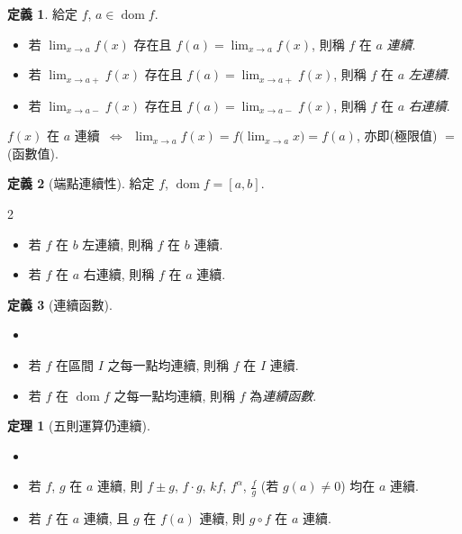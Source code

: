 \documentclass[12pt]{extarticle}
\newcommand{\ds}{\displaystyle}
\newcommand{\ifff}{\,\Longleftrightarrow\,}
\DeclareMathOperator*{\dom}{dom}
\theoremstyle{definition}
\newtheorem*{dfn}{定義}
\newtheorem*{thm}{定理}
\begin{document}
\begin{dfn} 給定 $f$, $a\in\dom f$. 
  \begin{itemize}\setlength\itemsep{0em}
    \item 若 $\ds\lim_{x\to a} f(x)$ 存在且 $\ds f(a)=\lim_{x\to a}f(x)$, 則稱 $f$ 在 $a$ \emph{連續}.  
    \item 若 $\ds\lim_{x\to a+} f(x)$ 存在且 $\ds f(a)=\lim_{x\to a+}f(x)$, 則稱 $f$ 在 $a$ \emph{左連續}.  
    \item 若 $\ds\lim_{x\to a-} f(x)$ 存在且 $\ds f(a)=\lim_{x\to a-}f(x)$, 則稱 $f$ 在 $a$ \emph{右連續}.  
  \end{itemize}
  $f(x)$ 在 $a$ 連續 $\ifff$ $\ds\lim_{x\to a}f(x) = f\big(\lim_{x\to a}x\big) = f(a)$, 亦即(極限值) $=$ (函數值).
\end{dfn}

\begin{dfn}[端點連續性]
  給定 $f$, $\dom f = [a, b]$.  
  \begin{multicols}{2}
    \begin{itemize}\setlength\itemsep{0em}
      \item 若 $f$ 在 $b$ 左連續, 則稱 $f$ 在 $b$ 連續.  
      \item 若 $f$ 在 $a$ 右連續, 則稱 $f$ 在 $a$ 連續.  
    \end{itemize}
  \end{multicols}
\end{dfn}

\begin{dfn}[連續函數] 
  \begin{itemize}\setlength\itemsep{0em}
    \item[]
    \item 若 $f$ 在區間 $I$ 之每一點均連續, 則稱 $f$ 在 $I$ 連續.  
    \item 若 $f$ 在 $\dom f$ 之每一點均連續, 則稱 $f$ 為\emph{連續函數}.  
  \end{itemize}
\end{dfn}

\begin{thm}[五則運算仍連續]
  \begin{itemize}\setlength\itemsep{0em}
    \item[] 
    \item 若 $f$, $g$ 在 $a$ 連續, 則 $f\pm g$, $f\cdot g$, $k f$, $f^\alpha$, $\ds\frac{f}{g}$ (若 $g(a)\ne 0$) 均在 $a$ 連續. 
    \item 若 $f$ 在 $a$ 連續, 且 $g$ 在 $f(a)$ 連續, 則 $g\circ f$ 在 $a$ 連續. 
  \end{itemize}
\end{thm}
\end{document}
